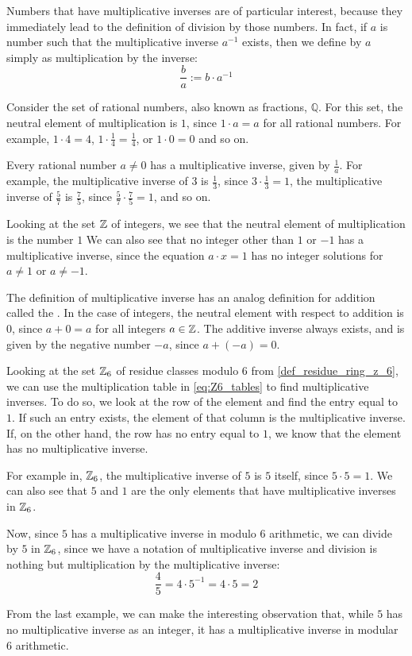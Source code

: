 Numbers that have multiplicative inverses are of particular interest, because they immediately lead to the definition of division by those numbers. In fact, if $a$ is number such that the multiplicative inverse $a^{-1}$ exists, then we define  by $a$ simply as multiplication by the inverse:
\begin{equation}
\frac{b}{a}:= b\cdot a^{-1}
\end{equation}
\begin{example} Consider the set of rational numbers, also known as fractions, $\mathbb{Q}$. For this set, the neutral element of multiplication is $1$, since $1\cdot a = a$ for all rational numbers. For example, $1\cdot 4=4$, $1\cdot \frac{1}{4}=\frac{1}{4}$, or $1\cdot 0 =0$ and so on.

Every rational number $a\neq 0$ has a multiplicative inverse, given by $\frac{1}{a}$.
For example, the multiplicative inverse of $3$ is $\frac{1}{3}$, since $3\cdot \frac{1}{3}=1$, the multiplicative inverse of $\frac{5}{7}$ is $\frac{7}{5}$, since $\frac{5}{7}\cdot \frac{7}{5}=1$, and so on.
\end{example}
\begin{example}Looking at  the set $\mathbb{Z}$ of integers, we see that the neutral element of multiplication is the number $1$ We can also see that no integer other than $1$ or $-1$ has a multiplicative inverse, since the equation $a\cdot x =1$ has no integer solutions for $a\neq 1$ or $a\neq -1$.

The definition of multiplicative inverse has an analog definition for addition called the . In the case of integers, the neutral element with respect to addition is $0$, since $a+0=a$ for all integers $a\in\mathbb{Z}$. The additive inverse always exists, and is given by the negative number $-a$, since $a+(-a)=0$.
\end{example}
\begin{example} Looking at the set $\mathbb{Z}_6$ of residue classes modulo $6$ from \examplename{} \ref{def_residue_ring_z_6}, we can use the multiplication table in \eqref{eq:Z6_tables} to find multiplicative inverses. To do so, we look at the row of the element and find the entry equal to $1$. If such an entry exists, the element of that column is the multiplicative inverse. If, on the other hand, the row has no entry equal to $1$, we know that the element has no multiplicative inverse.

For example in, $\mathbb{Z}_6$, the multiplicative inverse of $5$ is $5$ itself, since $5\cdot 5=1$. We can also see that $5$ and $1$ are the only elements that have multiplicative inverses in $\mathbb{Z}_6$.

Now, since $5$ has a multiplicative inverse in modulo $6$ arithmetic, we can divide by $5$ in $\mathbb{Z}_6$, since we have a notation of multiplicative inverse and division is nothing but multiplication by the multiplicative inverse:
$$
\frac{4}{5}= 4\cdot 5^{-1} = 4\cdot 5 = 2
$$
\end{example}
From the last example, we can make the interesting observation that, while $5$ has no multiplicative inverse as an integer, it has a multiplicative inverse in modular $6$ arithmetic.

